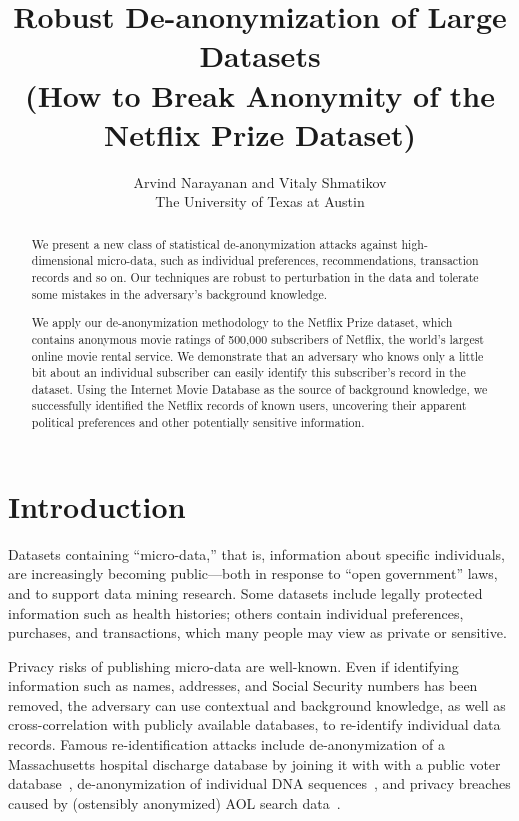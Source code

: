 \documentclass[11pt]{article}
\title{Robust De-anonymization of Large Datasets \\
({How to Break Anonymity of the Netflix Prize Dataset})}
\author{Arvind Narayanan and Vitaly Shmatikov \\[2ex]
        The University of Texas at Austin}
\begin{document}
\maketitle

\begin{abstract}

We present a new class of statistical de-anonymization attacks
against high-dimensional micro-data, such as individual preferences,
recommendations, transaction records and so on.  Our techniques are
robust to perturbation in the data and tolerate some mistakes in the
adversary's background knowledge.

We apply our de-anonymization methodology to the Netflix Prize dataset,
which contains anonymous movie ratings of 500,000 subscribers of Netflix,
the world's largest online movie rental service.  We demonstrate that
an adversary who knows only a little bit about an individual subscriber
can easily identify this subscriber's record in the dataset.  Using the
Internet Movie Database as the source of background knowledge, we
successfully identified the Netflix records of known users, uncovering
their apparent political preferences and other potentially sensitive
information.

\end{abstract}


\section{Introduction}

Datasets containing ``micro-data,'' that is, information about specific
individuals, are increasingly becoming public---both in response to ``open
government'' laws, and to support data mining research.  Some datasets
include legally protected information such as health histories; others
contain individual preferences, purchases, and transactions, which many
people may view as private or sensitive.

Privacy risks of publishing micro-data are well-known.  Even if
identifying information such as names, addresses, and Social Security
numbers has been removed, the adversary can use contextual and background
knowledge, as well as cross-correlation with publicly available databases,
to re-identify individual data records.  Famous re-identification
attacks include de-anonymization of a Massachusetts hospital discharge
database by joining it with with a public voter database~\cite{sweeney},
de-anonymization of individual DNA sequences~\cite{malin}, and privacy
breaches caused by (ostensibly anonymized) AOL search data~\cite{aol}.
\end{document}
